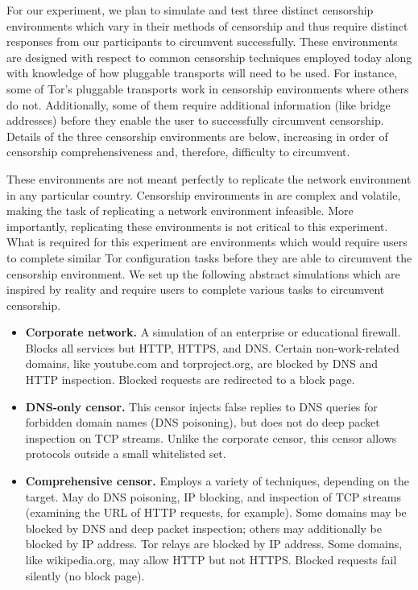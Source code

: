 \documentclass[letterpaper,twocolumn,11pt]{article}
\begin{document}
\indent \indent For our experiment, we plan to simulate and test three distinct censorship environments
which vary in their methods of censorship and thus require distinct responses from our 
participants to circumvent successfully. These environments are designed with respect to 
common censorship techniques employed 
today along with knowledge of how pluggable transports will need to be used.
For instance, some of Tor's pluggable transports work in censorship environments
where others do not. Additionally, some of them require additional information (like bridge 
addresses) before they enable the user to successfully circumvent censorship. 
Details of the three censorship environments are below, increasing in 
order of censorship comprehensiveness and, therefore, difficulty to circumvent. 

These environments are not meant perfectly to replicate the network environment
in any particular country.  Censorship environments in are complex and volatile, making
the task of replicating a network environment infeasible. More importantly, replicating these
environments is not critical to this experiment. What is required for this experiment are 
environments which would require users to complete similar Tor configuration 
tasks before they are able to circumvent the censorship environment. We set up the following 
abstract simulations which are inspired by reality and require users to complete various tasks
to circumvent censorship. 

\begin{itemize} \itemsep1pt \parskip0pt 
\item{\bfseries Corporate network.}
A simulation of an enterprise or educational firewall.
Blocks all services but HTTP, HTTPS, and DNS.
Certain non-work-related domains, like youtube.com and torproject.org,
are blocked by DNS and HTTP inspection.
Blocked requests are redirected to a block page.
\item{\bfseries DNS-only censor.}
This censor injects false replies to DNS queries
for forbidden domain names (DNS poisoning),
but does not do deep packet inspection on TCP streams.
Unlike the corporate censor, this censor allows protocols
outside a small whitelisted set.
\item{\bfseries Comprehensive censor.}
Employs a variety of techniques, depending on the target.
May do DNS poisoning, IP blocking, and inspection of TCP streams
(examining the URL of HTTP requests, for example).
Some domains may be blocked by DNS and deep packet inspection;
others may additionally be blocked by IP address.
Tor relays are blocked by IP address.
Some domains, like wikipedia.org, may allow HTTP but not HTTPS.
Blocked requests fail silently (no block page).
\end{itemize}
\end{document}
